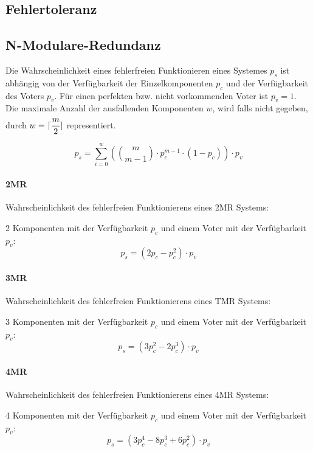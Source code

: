 \documentclass[a4paper, landscape]{article}
\begin{document}
\begin{multicols}{3}
        \section{Fehlertoleranz}
        
        \subsection{N-Modulare-Redundanz}
        Die Wahrscheinlichkeit eines fehlerfreien Funktionieren eines Systemes $p_{s}$ ist abhängig von der Verfügbarkeit der Einzelkomponenten $p_{c}$ und der Verfügbarkeit des Voters $p_{v}$. Für einen perfekten bzw. nicht vorkommenden Voter ist $p_{v} = 1$.
        Die maximale Anzahl der ausfallenden Komponenten $w$, wird falls nicht gegeben, durch $w = \lceil \cfrac{m}{2} \rceil$ representiert.
        
        \[
         p_{s} = \sum_{i = 0}^{w} \left( \binom{m}{m - 1} \cdot p_{c}^{m - 1} \cdot (1 - p_{c}) \right) \cdot p_{v}
        \]

        \paragraph{2MR} Wahrscheinlichkeit des fehlerfreien Funktionierens eines 2MR Systems:\par 
        2 Komponenten mit der Verfügbarkeit $p_{c}$ und einem Voter mit der Verfügbarkeit $p_{v}$:
        \[
         p_{s} = \left(2 p_{c} - p_{c}^{2} \right) \cdot p_{v}
        \]
        
        \paragraph{3MR} Wahrscheinlichkeit des fehlerfreien Funktionierens eines TMR Systems:\par 
        3 Komponenten mit der Verfügbarkeit $p_{c}$ und einem Voter mit der Verfügbarkeit $p_{v}$:
        \[
         p_{s} = \left(3 p_{c}^{2} - 2 p_{c}^{3} \right) \cdot p_{v}
        \]
        
        \paragraph{4MR} Wahrscheinlichkeit des fehlerfreien Funktionierens eines 4MR Systems:\par 
        4 Komponenten mit der Verfügbarkeit $p_{c}$ und einem Voter mit der Verfügbarkeit $p_{v}$:
        \[
         p_{s} = \left(3 p_{c}^{4} - 8 p_{c}^{3} + 6 p_{c}^{2} \right) \cdot p_{v}
        \]
        

\end{multicols}
\end{document}
